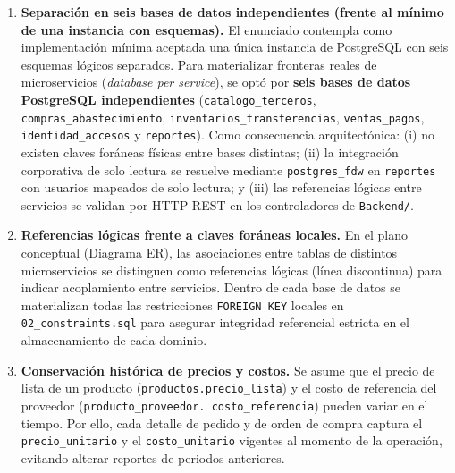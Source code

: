 \documentclass[11pt,oneside]{article}
\begin{document}
\begin{enumerate}[leftmargin=1.5em, itemsep=4pt]
  \item \textbf{Separaci\'on en seis bases de datos independientes (frente al
        m\'inimo de una instancia con esquemas).}
        El enunciado contempla como implementaci\'on m\'inima aceptada una
        \'unica instancia de PostgreSQL con seis esquemas l\'ogicos separados.
        Para materializar fronteras reales de microservicios (\textit{database
        per service}), se opt\'o por \textbf{seis bases de datos
        PostgreSQL independientes} (\texttt{catalogo\_terceros},
        \texttt{compras\_abastecimiento}, \texttt{inventarios\_transferencias},
        \texttt{ventas\_pagos}, \texttt{identidad\_accesos} y \texttt{reportes}).
        Como consecuencia arquitect\'onica: (i) no existen claves for\'aneas
        f\'isicas entre bases distintas; (ii) la integraci\'on corporativa de
        solo lectura se resuelve mediante \texttt{postgres\_fdw} en
        \texttt{reportes} con usuarios mapeados de solo lectura; y (iii) las
        referencias l\'ogicas entre servicios se validan por HTTP REST en los
        controladores de \texttt{Backend/}.

  \item \textbf{Referencias l\'ogicas frente a claves for\'aneas locales.}
        En el plano conceptual (Diagrama ER), las asociaciones entre tablas de
        distintos microservicios se distinguen como referencias l\'ogicas
        (l\'inea discontinua) para indicar acoplamiento entre servicios.
        Dentro de cada base de datos se materializan todas las restricciones
        \texttt{FOREIGN KEY} locales en \texttt{02\_constraints.sql} para
        asegurar integridad referencial estricta en el almacenamiento de cada
        dominio.

  \item \textbf{Conservaci\'on hist\'orica de precios y costos.}
        Se asume que el precio de lista de un producto
        (\texttt{productos.\allowbreak precio\_lista}) y el costo de referencia
        del proveedor (\texttt{producto\_\allowbreak proveedor.\allowbreak
        costo\_\allowbreak referencia}) pueden variar en el tiempo. Por ello,
        cada detalle de pedido y de orden de compra captura el
        \texttt{precio\_\allowbreak unitario} y el
        \texttt{costo\_\allowbreak unitario} vigentes al momento de la
        operaci\'on, evitando alterar reportes de periodos anteriores.


\end{enumerate}
\end{document}
